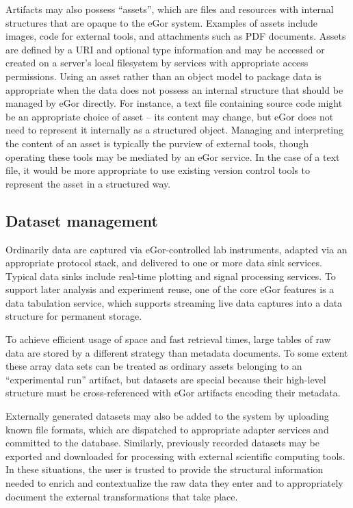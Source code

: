 \documentclass[../thesis]{subfiles}
\begin{document}
Artifacts may also possess ``assets'', which are files and
resources with internal structures that are opaque to the eGor
system. Examples of assets include images, code for external tools,
and attachments such as PDF documents. Assets are defined by a
\gls{URI} and optional type information and may be accessed or created
on a server's local filesystem by services with appropriate access
permissions. Using an asset rather than an object model to package
data is appropriate when the data does not possess an internal
structure that should be managed by eGor directly. For instance, a
text file containing source code might be an appropriate choice of
asset -- its content may change, but eGor does not need to represent
it internally as a structured object. Managing and interpreting the
content of an asset is typically the purview of external tools, though
operating these tools may be mediated by an eGor service. In the case
of a text file, it would be more appropriate to use existing version
control tools to represent the asset in a structured way.

\subsection{Dataset management}
Ordinarily data are captured via eGor-controlled lab instruments,
adapted via an appropriate protocol stack, and delivered to one or
more data sink services. Typical data sinks include real-time plotting
and signal processing services. To support later analysis and
experiment reuse, one of the core eGor features is a data tabulation
service, which supports streaming live data captures into a data
structure for permanent storage.

To achieve efficient usage of space and fast retrieval times, large
tables of raw data are stored by a different strategy than metadata
documents. To some extent these array data sets can be treated as
ordinary assets belonging to an ``experimental run'' artifact, but
datasets are special because their high-level structure must be
cross-referenced with eGor artifacts encoding their metadata.


Externally generated datasets may also be added to the system by
uploading known file formats, which are dispatched to appropriate
adapter services and committed to the database.  Similarly, previously
recorded datasets may be exported and downloaded for processing with
external scientific computing tools. In these situations, the user is
trusted to provide the structural information needed to enrich and
contextualize the raw data they enter and to appropriately document
the external transformations that take place.
\end{document}
